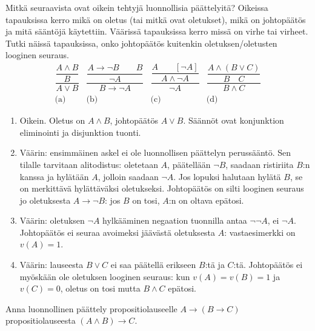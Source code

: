 \documentclass[11pt,a4paper]{amsart}
\begin{document}
\begin{exercise}
Mitkä seuraavista ovat oikein tehtyjä luonnollisia päättelyitä? Oikeissa
tapauksissa kerro mikä on oletus (tai mitkä ovat oletukset), mikä on
johtopäätös ja mitä sääntöjä käytettiin. Väärissä tapauksissa kerro missä
on virhe tai virheet. Tutki näissä tapauksissa, onko johtopäätös kuitenkin
oletuksen/oletusten looginen seuraus.
\[
\begin{array}{cccc}
\dfrac{\dfrac{A \land B}{B}}{A \lor B}
& \dfrac{\dfrac{A \rightarrow \neg B \qquad B}{\neg A}}{B \rightarrow \neg A}
& \dfrac{\dfrac{A \qquad [\neg A]}{A \land \neg A}}{\neg A}
& \dfrac{\dfrac{A \land (B \lor C)}{B \quad C}}{B \land C}
\\[1.2em]
\text{(a)} & \text{(b)} & \text{(c)} & \text{(d)}
\end{array}
\]
\end{exercise}

\begin{solution}
\leavevmode\par
\begin{enumerate}[label=\alph*)]
\item Oikein. Oletus on \(A\land B\), johtopäätös \(A\lor B\).
Säännöt ovat konjunktion eliminointi ja disjunktion tuonti.

\item Väärin: ensimmäinen askel ei ole luonnollisen päättelyn
perussääntö. Sen tilalle tarvitaan alitodistus: oletetaan \(A\),
päätellään \(\neg B\), saadaan ristiriita \(B\):n kanssa ja
hylätään \(A\), jolloin saadaan \(\neg A\).
Jos lopuksi halutaan hylätä \(B\), se on merkittävä
hylättäväksi oletukseksi. Johtopäätös on silti looginen seuraus
jo oletuksesta \(A\to\neg B\): jos \(B\) on tosi, \(A\):n
on oltava epätosi.

\item Väärin: oletuksen \(\neg A\) hylkääminen negaation
tuonnilla antaa \(\neg\neg A\), ei \(\neg A\).
Johtopäätös ei seuraa avoimeksi jäävästä oletuksesta \(A\):
vastaesimerkki on \(v(A)=1\).

\item Väärin: lauseesta \(B\lor C\) ei saa päätellä erikseen
\(B\):tä ja \(C\):tä. Johtopäätös ei myöskään ole oletuksen
looginen seuraus: kun \(v(A)=v(B)=1\) ja \(v(C)=0\),
oletus on tosi mutta \(B\land C\) epätosi.
\end{enumerate}
\end{solution}

\begin{exercise}
Anna luonnollinen päättely propositiolauseelle \(A \rightarrow (B
\rightarrow C)\)
propositiolauseesta \((A \land B) \rightarrow C\).
\end{exercise}
\end{document}
